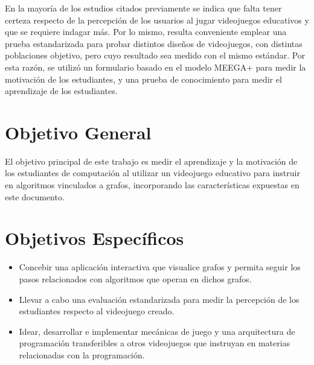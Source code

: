 En la mayoría de los estudios citados previamente se indica que falta tener certeza respecto de la percepción de los usuarios al jugar videojuegos educativos y que se requiere indagar más. Por lo mismo, resulta conveniente emplear una prueba estandarizada para probar distintos diseños de videojuegos, con distintas poblaciones objetivo, pero cuyo resultado sea medido con el mismo estándar. Por esta razón, se utilizó un formulario basado en el modelo MEEGA+ \cite{meegaplus} para medir la motivación de los estudiantes, y una prueba de conocimiento para medir el aprendizaje de los estudiantes.




\section{Objetivo General}

El objetivo principal de este trabajo es medir el aprendizaje y la motivación de los estudiantes de computación al utilizar un videojuego educativo para instruir en algoritmos vinculados a grafos, incorporando las características expuestas en este documento.

\section{Objetivos Específicos}

\begin{itemize}

\item Concebir una aplicación interactiva que visualice grafos y permita seguir los pasos relacionados con algoritmos que operan en dichos grafos.

\item Llevar a cabo una evaluación estandarizada para medir la percepción de los estudiantes respecto al videojuego creado.

\item Idear, desarrollar e implementar mecánicas de juego y una arquitectura de programación transferibles a otros videojuegos que instruyan en materias relacionadas con la programación.


\end{itemize}



